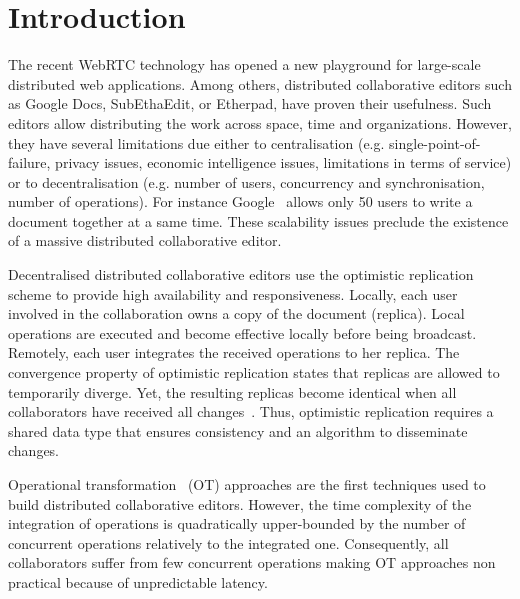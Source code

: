 
\section{Introduction}

The recent WebRTC technology has opened a new playground for large-scale
distributed web applications. Among others, distributed collaborative editors
such as Google Docs, SubEthaEdit, or Etherpad, have proven their
usefulness. Such editors allow distributing the work across space, time and
organizations. However, they have several limitations due either to
centralisation (e.g. single-point-of-failure, privacy issues, economic
intelligence issues, limitations in terms of service) or to decentralisation
(e.g. number of users, concurrency and synchronisation, number of
operations). For instance Google~\cite{nichols1995high} allows only 50 users to
write a document together at a same time. These scalability issues preclude the
existence of a massive distributed collaborative editor.

Decentralised distributed collaborative editors use the optimistic replication
scheme \cite{johnson1975maintenance, saito2005optimistic} to provide high
availability and responsiveness. Locally, each user involved in the
collaboration owns a copy of the document (replica). Local operations are
executed and become effective locally before being broadcast. Remotely, each
user integrates the received operations to her replica. The convergence property
of optimistic replication states that replicas are allowed to temporarily
diverge. Yet, the resulting replicas become identical when all collaborators
have received all changes~\cite{demers1987epidemic}.  Thus, optimistic
replication requires a shared data type that ensures consistency and an
algorithm to disseminate changes.

Operational transformation~\cite{sun1998operational, sun2009contextbased} (OT)
approaches are the first techniques used to build distributed collaborative
editors. However, the time complexity of the integration of operations is
quadratically upper-bounded by the number of concurrent operations relatively to
the integrated one. Consequently, all collaborators suffer from few concurrent
operations making OT approaches non practical because of unpredictable latency.

